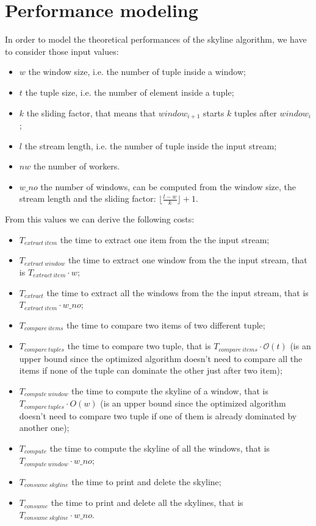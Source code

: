\section{Performance modeling}

In order to model the theoretical performances of the skyline algorithm, we have to consider those input values:
\begin{itemize}
    \item $w$ the window size, i.e. the number of tuple inside a window;
    \item $t$ the tuple size, i.e. the number of element inside a tuple;
    \item $k$ the sliding factor, that means that $window_{i+1}$ starts $k$ tuples after $window_i$;
    \item $l$ the stream length, i.e. the number of tuple inside the input stream;
    \item $nw$ the number of workers.
    \item $w\_no$ the number of windows, can be computed from the window size, the stream length and the sliding factor: $\lfloor\frac{l-w}{k}\rfloor+1$.
\end{itemize}

\bigskip\noindent
From this values we can derive the following costs:
\begin{itemize}
    \item $T_{extract\ item}$ the time to extract one item from the the input stream;
    \item $T_{extract\ window}$ the time to extract one window from the the input stream, that is $T_{extract\ item} \cdot w$;
    \item $T_{extract}$ the time to extract all the windows from the the input stream, that is $T_{extract\ item} \cdot w\_no$;
    \item $T_{compare\ items}$ the time to compare two items of two different tuple;
    \item $T_{compare\ tuples}$ the time to compare two tuple, that is $T_{compare\ items} \cdot \mathcal{O}(t)$ (is an upper bound since the optimized algorithm doesn't need to compare all the items if none of the tuple can dominate the other just after two item);
    \item $T_{compute\ window}$ the time to compute the skyline of a window, that is $T_{compare\ tuples} \cdot O(w)$ (is an upper bound since the optimized algorithm doesn't need to compare two tuple if one of them is already dominated by another one);
    \item $T_{compute}$ the time to compute the skyline of all the windows, that is $T_{compute\ window} \cdot w\_no$;
    \item $T_{consume\ skyline}$ the time to print and delete the skyline;
    \item $T_{consume}$ the time to print and delete all the skylines, that is $T_{consume\ skyline} \cdot w\_no$.
\end{itemize}


